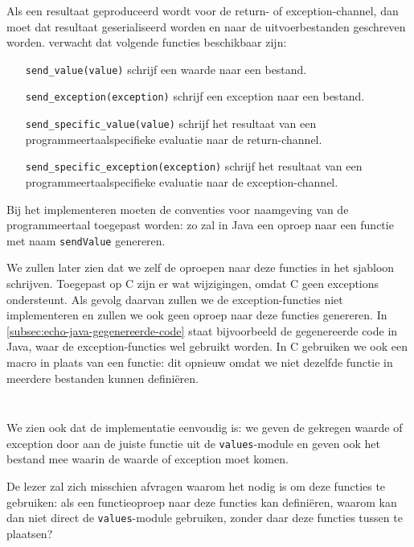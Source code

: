 \inputminted[firstline=13,lastline=21]{mako}{sources/c-context.mako}

Als een resultaat geproduceerd wordt voor de return- of exception-channel, dan moet dat resultaat geserialiseerd worden en naar de uitvoerbestanden geschreven worden.
\tested{} verwacht dat volgende functies beschikbaar zijn:

\begin{itemize}
    \item[\texttt{send\_value(value)}] schrijf een waarde naar een bestand.
    \item[\texttt{send\_exception(exception)}] schrijf een exception naar een bestand.
    \item[\texttt{send\_specific\_value(value)}] schrijf het resultaat van een programmeertaalspecifieke evaluatie naar de return-channel.
    \item[\texttt{send\_specific\_exception(exception)}] schrijf het resultaat van een programmeertaalspecifieke evaluatie naar de exception-channel.
\end{itemize}

Bij het implementeren moeten de conventies voor naamgeving van de programmeertaal toegepast worden: zo zal \tested{} in Java een oproep naar een functie met naam \texttt{sendValue} genereren.

We zullen later zien dat we zelf de oproepen naar deze functies in het sjabloon schrijven.
Toegepast op C zijn er wat wijzigingen, omdat C geen exceptions ondersteunt.
Als gevolg daarvan zullen we de exception-functies niet implementeren en zullen we ook geen oproep naar deze functies genereren.
In \cref{subsec:echo-java-gegenereerde-code} staat bijvoorbeeld de gegenereerde code in Java, waar de exception-functies wel gebruikt worden.
In C gebruiken we ook een macro in plaats van een functie: dit opnieuw omdat we niet dezelfde functie in meerdere bestanden kunnen definiëren.

\inputminted[firstline=25,lastline=27]{mako}{sources/c-context.mako}
\vspace{-1.7cm} %
\inputminted[firstline=29,lastline=30]{mako}{sources/c-context.mako}

We zien ook dat de implementatie eenvoudig is: we geven de gekregen waarde of exception door aan de juiste functie uit de \texttt{values}-module en geven ook het bestand mee waarin de waarde of exception moet komen.

De lezer zal zich misschien afvragen waarom het nodig is om deze functies te gebruiken: als \tested{} een functieoproep naar deze functies kan definiëren, waarom kan \tested{} dan niet direct de \texttt{values}-module gebruiken, zonder daar deze functies tussen te plaatsen?

